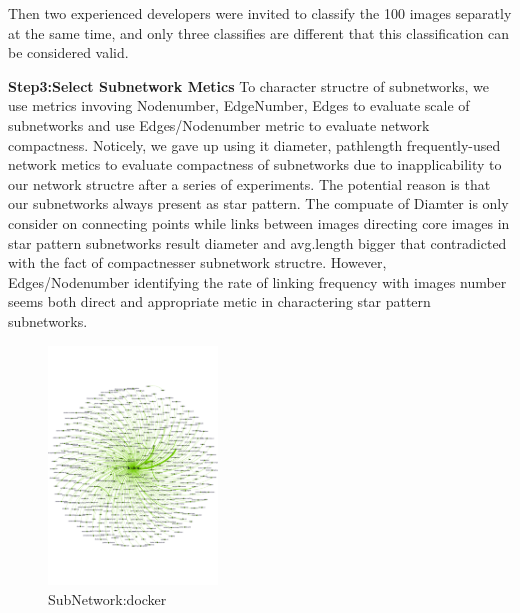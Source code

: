 \documentclass[sigconf]{acmart}
\begin{document}
Then two experienced developers were invited to classify the 100 images separatly at the same time, and only three classifies are different that this classification can be considered valid.

 

 
\noindent\textbf{Step3:Select Subnetwork Metics} To character structre of subnetworks, we use metrics invoving Nodenumber, EdgeNumber, Edges to evaluate scale of subnetworks and use Edges/Nodenumber metric to evaluate network compactness. Noticely, we gave up using it diameter, pathlength frequently-used network metics to evaluate compactness of subnetworks due to inapplicability to our network structre after a series of experiments. The potential reason is that our subnetworks always present as star pattern. The compuate of Diamter is only consider on connecting points while links between images directing core images in star pattern subnetworks result diameter and avg.length bigger that contradicted with the fact of compactnesser subnetwork structre. However, Edges/Nodenumber identifying the rate of linking frequency with images number seems both direct and appropriate metic in charactering star pattern subnetworks.   


\begin{figure}[htbp]
\centerline{\includegraphics[width=0.4\textwidth,trim=0 130 0 130,clip]{picture//image_network_docker.pdf}}
\caption{SubNetwork:docker}
\label{fig}
\end{figure}
\end{document}
